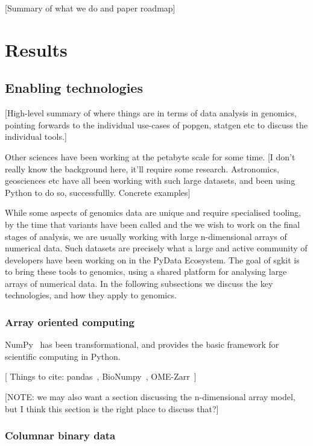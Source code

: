 \documentclass[9pt,lineno]{elife}
\begin{document}
[Summary of what we do and paper roadmap]

\section{Results}

\subsection{Enabling technologies}

[High-level summary of where things are in terms of data analysis
in genomics, pointing forwards to
the individual use-cases of popgen, statgen etc to discuss the
individual tools.]

Other sciences have been working at the petabyte scale for some time.
[I don't really know the background here, it'll require some research.
Astronomics, geosciences etc have all been working with such large
datasets, and been using Python to do so, successfullly. Concrete
examples]

While some aspects of genomics data are unique and require specialised
tooling, by the time that variants have been called and the we wish
to work on the final stages of analysis, we are usually
working with large n-dimensional arrays of numerical data. Such
datasets are precisely what a large and active community of
developers have been working on in the PyData Ecosystem. The goal
of sgkit is to bring these tools to genomics, using a
shared platform for analysing large arrays of numerical data. In the
following subsections we discuss the key technologies, and how
they apply to genomics.

\subsubsection{Array oriented computing}

NumPy~\citep{harris2020array} has been transformational, and provides
the basic framework for scientific computing in Python.

[ Things to cite: pandas~\citep{mckinney2010data},
BioNumpy~\citep{rand2022bionumpy}, OME-Zarr~\citep{moore2023ome}]

[NOTE: we may also want a section discussing the n-dimensional array model,
but I think this section is the right place to discuss that?]

\subsubsection{Columnar binary data}
\end{document}
